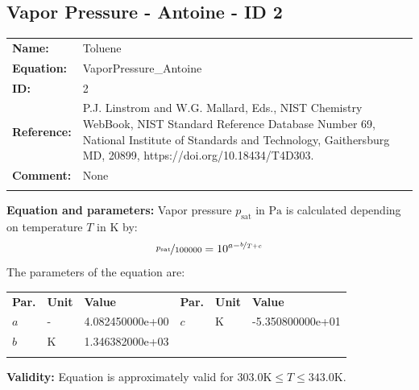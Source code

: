 \FloatBarrier
\newpage
\subsection{Vapor Pressure - Antoine - ID 2}
%
\begin{tabular}[l]{|lp{11.5cm}|}
\hline
\addlinespace

\textbf{Name:} & Toluene \\
\textbf{Equation:} & VaporPressure\_Antoine \\
\textbf{ID:} & 2 \\
\textbf{Reference:} & P.J. Linstrom and W.G. Mallard, Eds., NIST Chemistry WebBook, NIST Standard Reference Database Number 69, National Institute of Standards and Technology, Gaithersburg MD, 20899, https://doi.org/10.18434/T4D303. \\
\textbf{Comment:} & None \\

\addlinespace
\hline
\end{tabular}
\newline

\textbf{Equation and parameters:}
\newline
%
Vapor pressure $p_\mathrm{sat}$ in $\si{\pascal}$ is calculated depending on temperature $T$ in $\si{\kelvin}$ by:
%
\begin{equation*}
\nicefrac{p_\mathrm{sat}}{100000} = 10^{a - \nicefrac{b}{T + c}}
\end{equation*}
%
The parameters of the equation are:
%
\begin{longtable}[l]{lll|lll}
\toprule
\addlinespace
\textbf{Par.} & \textbf{Unit} & \textbf{Value} &	\textbf{Par.} & \textbf{Unit} & \textbf{Value} \\
\addlinespace
\midrule
\endhead

\bottomrule
\endfoot
\bottomrule
\endlastfoot
\addlinespace

$a$ & - & 4.082450000e+00 & $c$ & $\si{\kelvin}$  & -5.350800000e+01 \\
$b$ & $\si{\kelvin}$ & 1.346382000e+03 & & & \\

\addlinespace\end{longtable}

\textbf{Validity:}
\newline
Equation is approximately valid for $303.0 \si{\kelvin} \leq T \leq 343.0 \si{\kelvin}$.
\newline

